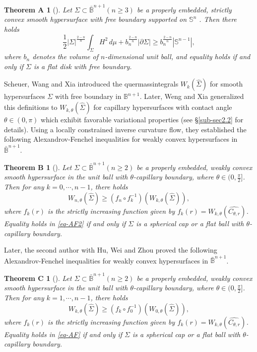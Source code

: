 \documentclass[11pt,reqno]{amsart}
\newtheorem*{thmA}{Theorem A}
\newtheorem*{thmB}{Theorem B}
\newtheorem*{thmC}{Theorem C}
\theoremstyle{definition}
\theoremstyle{remark}
\numberwithin{equation}{section}
\renewcommand{\(}{\left(}
\renewcommand{\)}{\right)}
\renewcommand{\-}{\overline}
\renewcommand{\t}{\theta}
\begin{document}
\begin{thmA}[\cite{Lambert-Scheuer2017}]
	Let $\Sigma\subset\bar{\mathbb{B}}^{n+1} (n\geq 3)$ be a properly embedded, strictly convex smooth hypersurface with free boundary supported on $\mathbb{S}^n$ . Then there holds
	\begin{equation}
		\frac{1}{2}|\Sigma|^{\frac{2-n}{n}}\int_{\Sigma}{H^2}\,d\mu+b_n^{\frac{2-n}{n}}|\partial\Sigma|\geq b_n^{\frac{2-n}{n}}|\mathbb{S}^{n-1}|,
	\end{equation}
where $b_n$ denotes the volume of $n$-dimensional unit ball, and equality holds if and only if $\Sigma$ is a flat disk with free boundary.
\end{thmA}

Scheuer, Wang and Xia \cite{Scheuer-Wang-Xia2018} introduced the quermassintegrals $W_k(\widehat{\Sigma})$ for smooth hypersurfaces $\Sigma$ with free boundary in $\mathbb{B}^{n+1}$. Later,  Weng and Xia \cite{Weng-Xia2022} generalized this definitions to $W_{k,\theta}(\widehat{\Sigma})$ for capillary hypersurfaces with contact angle $\theta\in(0,\pi)$ which exhibit favorable variational properties (see \S\ref{sub-sec2.2} for details). Using a locally constrained inverse curvature flow, they established  the following Alexandrov-Fenchel inequalities for weakly convex hypersurfaces in $\bar{\mathbb{B}}^{n+1}$.

\begin{thmB}[\cites{Scheuer-Wang-Xia2018, Weng-Xia2022}]
	Let $\Sigma\subset\bar{\mathbb{B}}^{n+1} (n\geq 2)$ be a properly embedded, weakly convex smooth hypersurface in the unit ball with $\theta$-capillary boundary, where $\t\in (0,\frac{\pi}{2}]$. Then for any $k=0,\cdots, n-1$, there holds
	\begin{equation}\label{eq-AF2}
		W_{n,\theta}(\widehat{\Sigma})\geq (f_n\circ f_k^{-1})(W_{k,\theta}(\widehat{\Sigma})),
	\end{equation}
	where $f_k(r)$ is the strictly increasing function given by $f_k(r)=W_{k,\theta}(\widehat{C_{\theta,r}})$. Equality holds in \eqref{eq-AF2} if and only if $\Sigma$ is a spherical cap or a flat ball with $\theta$-capillary boundary.
\end{thmB}

Later, the second author with Hu, Wei and Zhou \cite{HWYZ-2023} proved the following Alexandrov-Fenchel inequalities for weakly convex hypersurfaces in $\bar{\mathbb{B}}^{n+1}$.

\begin{thmC}[\cite{HWYZ-2023}]
	Let $\Sigma\subset\bar{\mathbb{B}}^{n+1} (n\geq 2)$ be a properly embedded, weakly convex smooth hypersurface in the unit ball with $\theta$-capillary boundary, where $\t\in (0,\frac{\pi}{2}]$. Then for any $k=1,\cdots, n-1$,  there holds
	\begin{equation}\label{eq-AF}
		W_{k,\theta}(\widehat{\Sigma})\geq (f_k\circ f_0^{-1})(W_{0,\theta}(\widehat{\Sigma})),
	\end{equation}
	where $f_k(r)$ is the strictly increasing function given by $f_k(r)=W_{k,\theta}(\widehat{C_{\theta,r}})$. Equality holds in \eqref{eq-AF} if and only if $\Sigma$ is a spherical cap or a flat ball with $\theta$-capillary boundary.
\end{thmC}
\end{document}
